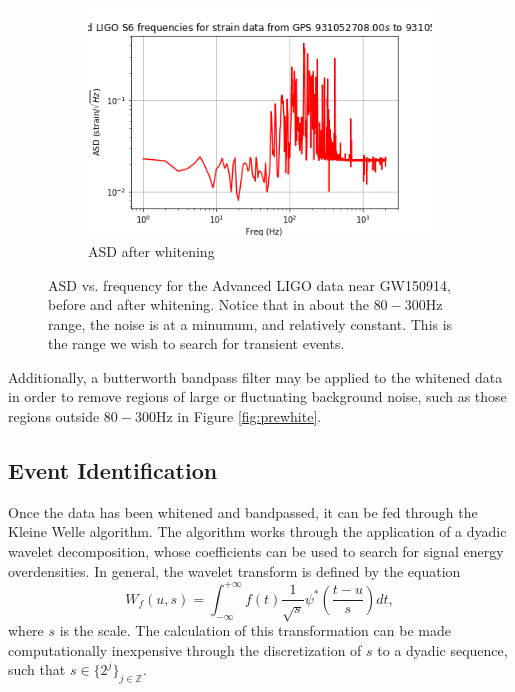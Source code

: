 \documentclass{article}
\begin{document}
\begin{figure}
\begin{subfigure}{\textwidth}
\includegraphics[width=\textwidth]{white.png}
\caption{ASD after whitening}
\label{fig:postwhite}
\end{subfigure}
\caption{ASD vs. frequency for the Advanced LIGO data near GW150914, before and after whitening. Notice that in about the $80-300\mathrm{Hz}$ range, the noise is at a minumum, and relatively constant. This is the range we wish to search for transient events.}
\label{fig:asd}
\end{figure}

Additionally, a butterworth bandpass filter may be applied to the whitened data\citep{Blackburn2007}\citep{LIGOScientificCollaboration} in order to remove regions of large or fluctuating background noise, such as those regions outside $80-300\mathrm{Hz}$ in Figure \ref{fig:prewhite}.

\subsection{Event Identification}
Once the data has been whitened and bandpassed, it can be fed through the Kleine Welle algorithm. The algorithm works through the application of a dyadic wavelet decomposition, whose coefficients can be used to search for signal energy overdensities\citep{Biswas2013}\citep{Blackburn2007}. In general, the wavelet transform is defined by the equation\citep{Blackburn2007}\citep{Mallat1999}
\begin{equation}
W_{f}(u,s)=\int_{-\infty}^{+\infty}f(t)\frac{1}{\sqrt{s}}\psi^{*}\left(\frac{t-u}{s}\right)dt, \label{eq:wavtr}
\end{equation}
where $s$ is the scale. The calculation of this transformation can be made computationally inexpensive through the discretization of $s$ to a dyadic sequence, such that $s \in \{2^{j}\}_{j\in\mathbb{Z}}$\citep{Blackburn2007}\citep{Mallat1999}.
\end{document}
